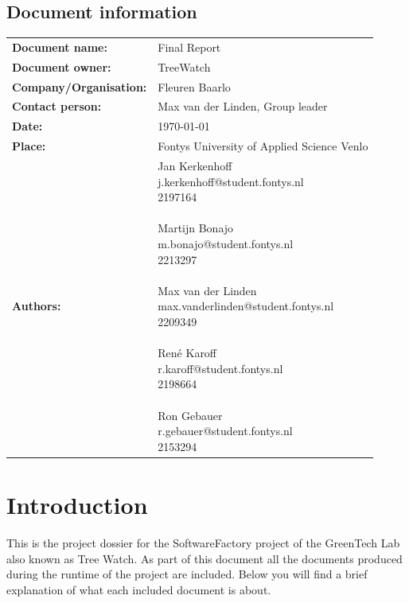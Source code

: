 \documentclass[12pt]{report}
\begin{document}
  \section*{Document information}
	\begin{tabular}{ll}
		\textbf{Document name:} & Final Report\\
		\textbf{Document owner:} & TreeWatch \\
		\textbf{Company/Organisation:} & Fleuren Baarlo \\
		\textbf{Contact person:} & Max van der Linden, Group leader \\
		\textbf{Date:} & \today \\
		\textbf{Place:} & Fontys University of Applied Science Venlo \\
		\textbf{Authors:} & \parbox[t]{5cm}{
		Jan Kerkenhoff\\ j.kerkenhoff@student.fontys.nl\\ 2197164 \\ \\
		Martijn Bonajo\\ m.bonajo@student.fontys.nl\\ 2213297 \\ \\
		Max van der Linden\\ max.vanderlinden@student.fontys.nl\\ 2209349 \\ \\
		René Karoff\\ r.karoff@student.fontys.nl\\ 2198664 \\ \\
		Ron Gebauer\\ r.gebauer@student.fontys.nl\\ 2153294 \\ }
	\end{tabular}


  \tableofcontents
  
  \chapter{Introduction}
  This is the project dossier for the SoftwareFactory project of the GreenTech Lab also known as Tree Watch. As part of this document all the documents produced during the runtime of the project are included. Below you will find a brief explanation of what each included document is about.
  
\end{document}
